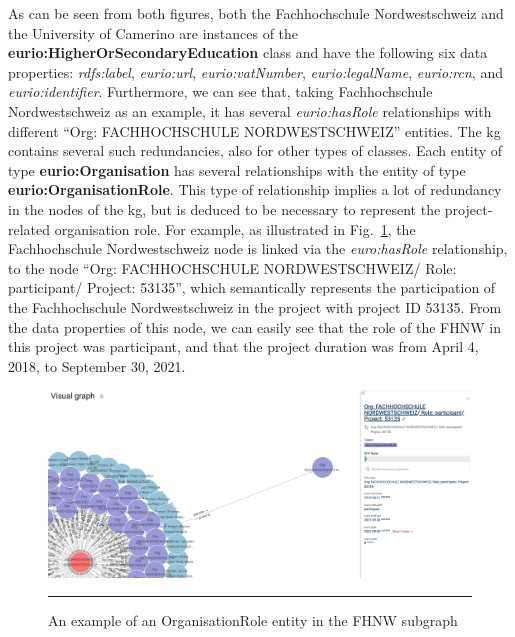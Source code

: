 As can be seen from both figures, both the Fachhochschule Nordwestschweiz and the University of Camerino are instances of the \textbf{eurio:HigherOrSecondaryEducation} class and have the following six data properties: \textit{rdfs:label}, \textit{eurio:url}, \textit{eurio:vatNumber}, \textit{eurio:legalName}, \textit{eurio:rcn}, and \textit{eurio:identifier}.
Furthermore, we can see that, taking Fachhochschule Nordwestschweiz as an example, it has several \textit{eurio:hasRole} relationships with different ``Org: FACHHOCHSCHULE NORDWESTSCHWEIZ'' entities.
The \gls{kg} contains several such redundancies, also for other types of classes.
Each entity of type \textbf{eurio:Organisation} has several relationships with the entity of type \textbf{eurio:OrganisationRole}.
This type of relationship implies a lot of redundancy in the nodes of the \gls{kg}, but is deduced to be necessary to represent the project-related organisation role.
For example, as illustrated in Fig.~\ref{fig:fhnw-organisationRole-example}, the Fachhochschule Nordwestschweiz node is linked via the \textit{euro:hasRole} relationship, to the node ``Org: FACHHOCHSCHULE NORDWESTSCHWEIZ/ Role: participant/ Project: 53135'', which semantically represents the participation of the Fachhochschule Nordwestschweiz in the project with project ID 53135.
From the data properties of this node, we can easily see that the role of the FHNW in this project was participant, and that the project duration was from April 4, 2018, to September 30, 2021.

\begin{figure}[htbp]
    \centering
 \includegraphics[width=.9\textwidth]{figures/architecture/graphdb-fhnw-organisationRole-example.png}
     \rule{35em}{0.5pt}
    \caption{An example of an OrganisationRole entity in the FHNW subgraph}
 \label{fig:fhnw-organisationRole-example}
\end{figure}

